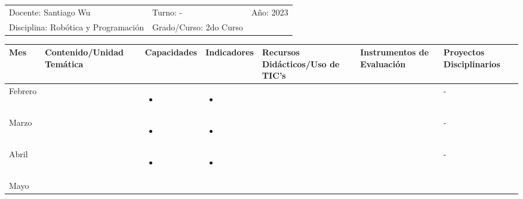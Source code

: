\documentclass[landscape, a4paper, 10pt]{article}
\newcommand{\smallcellwidth}{0.7in}
\newcommand{\normalcellwidth}{1.2in}
\newcommand{\bigcellwidth}{2.0in}
\newcommand{\profesor}{Santiago Wu}
\newcommand{\discipline}{Robótica y Programación}
\newcommand{\currentyear}{2023}
\begin{document}
	\pagebreak[4]
	\begin{tabularx}{\textwidth}{ >{\raggedright\arraybackslash}X >{\raggedright\arraybackslash}X >{\raggedright\arraybackslash}X }
		Docente: \profesor &
		Turno: - &
		Año: \currentyear \\
		Disciplina: \discipline &
		Grado/Curso: 2do Curso &
		 \\
	\end{tabularx}
	\centering
	\begin{longtable}{|m{\smallcellwidth}|p{\normalcellwidth}|p{\bigcellwidth}|p{\bigcellwidth}|p{\normalcellwidth}|p{\normalcellwidth}|p{\normalcellwidth}|}
		\hline
		\textbf{Mes} &
		\textbf{Contenido/Unidad Temática} &
		\textbf{Capacidades} &
		\textbf{Indicadores} &
		\textbf{Recursos Didácticos/Uso de TIC's} &
		\textbf{Instrumentos de Evaluación} &
		\textbf{Proyectos Disciplinarios} \\
		\hline
		\endhead
		Febrero &
		 &
		\begin{itemize}
			\item 
		\end{itemize} &
		\begin{itemize}
			\item 
		\end{itemize} &
		  &
		  &
		 - \\
		\hline
		Marzo &
		 &
		\begin{itemize}
			\item 
		\end{itemize} &
		\begin{itemize}
			\item 
		\end{itemize} &
		  &
		  &
		 - \\
		\hline
		Abril &
		 &
		\begin{itemize}
			\item 
		\end{itemize} &
		\begin{itemize}
			\item 
		\end{itemize} &
		  &
		  &
		 - \\
		\hline
		Mayo &
		 &
		\begin{itemize}

\end{itemize}
\end{longtable}
\end{document}
